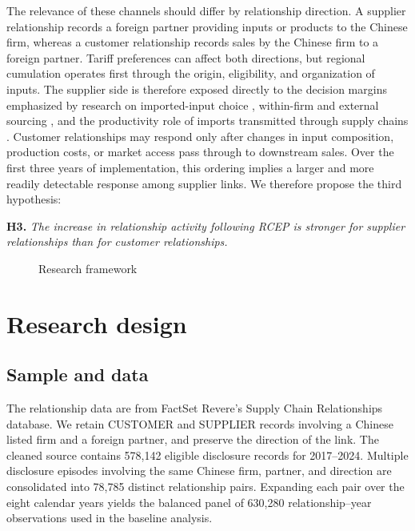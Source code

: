\documentclass[preprint,12pt,authoryear]{elsarticle}
\begin{document}
The relevance of these channels should differ by relationship direction. A supplier relationship records a foreign partner providing inputs or products to the Chinese firm, whereas a customer relationship records sales by the Chinese firm to a foreign partner. Tariff preferences can affect both directions, but regional cumulation operates first through the origin, eligibility, and organization of inputs. The supplier side is therefore exposed directly to the decision margins emphasized by research on imported-input choice \citep{handley2024input}, within-firm and external sourcing \citep{garg2023within}, and the productivity role of imports transmitted through supply chains \citep{newman2023imports}. Customer relationships may respond only after changes in input composition, production costs, or market access pass through to downstream sales. Over the first three years of implementation, this ordering implies a larger and more readily detectable response among supplier links. We therefore propose the third hypothesis:

\noindent\textbf{H3.} \textit{The increase in relationship activity following RCEP is stronger for supplier relationships than for customer relationships.}

\begin{figure}[H]
\centering
\fbox{\rule{0pt}{0.28\textheight}\rule{0.88\textwidth}{0pt}}
\caption{Research framework}
\label{fig:framework}
\end{figure}

\section{Research design}
\label{sec:design}

\subsection{Sample and data}

The relationship data are from FactSet Revere's Supply Chain Relationships database. We retain CUSTOMER and SUPPLIER records involving a Chinese listed firm and a foreign partner, and preserve the direction of the link. The cleaned source contains 578,142 eligible disclosure records for 2017--2024. Multiple disclosure episodes involving the same Chinese firm, partner, and direction are consolidated into 78,785 distinct relationship pairs. Expanding each pair over the eight calendar years yields the balanced panel of 630,280 relationship--year observations used in the baseline analysis.
\end{document}
